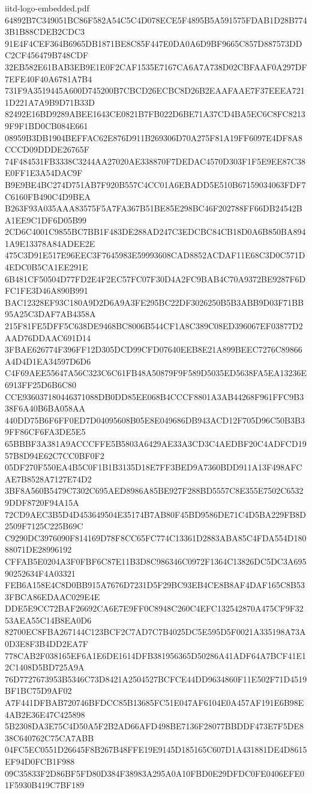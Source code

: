 \begin{filecontents*}[overwrite]{iitd-logo-embedded.pdf}
64892B7C349051BC86F582A54C5C4D078ECE5F4895B5A591575FDAB1D28B7743B1B88CDEB2CDC3
91E4F4CEF364B6965DB1871BE8C85F447E0DA0A6D9BF9665C857D887573DDC2CF456479B748CDF
32EB582E61BAB3EB9E1E0F2CAF1535E7167CA6A7A738D02CBFAAF0A297DF7EFE40F40A6781A7B4
731F9A3519445A600D745200B7CBCD26ECBC8D26B2EAAFAAE7F37EEEA7211D221A7A9B9D71B33D
82492E16BD9289ABEE1643CE0821B7FB022D6BE71A37CD4BA5EC6C8FC82139F9F1BD0CB084E661
08959B3DB1904BEFFAC62E876D911B269306D70A275F81A19FF6097E4DF8A8CCCD09DDDE26765F
74F484531FB3338C3244AA27020AE338870F7DEDAC4570D303F1F5E9EE87C38E0FF1E3A54DAC9F
B9E9BE4BC274D751AB7F920B557C4CC01A6EBADD5E510B67159034063FDF7C6160FB490C4D9BEA
B263F93A035AAA83575F5A7FA367B51BE85E298BC46F202788FF66DB24542BA1EE9C1DF6D05B99
2CD6C4001C9855BC7BB1F483DE288AD247C3EDCBC84CB18D0A6B850BA8941A9E13378A84ADEE2E
475C3D91E517E96EEC3F7645983E59993608CAD8852ACDAF11E68C3D0C571D4EDC0B5CA1EE291E
6B481CF50504D77FD2E4F2EC57FC07F30D4A2FC9BAB4C70A9372BE9287F6DFC1FE3D46A890B991
BAC12328EF93C180A9D2D6A9A3FE295BC22DF3026250B5B3ABB9D03F71BB95A25C3DAF7AB4358A
215F81FE5DFF5C638DE9468BC8006B544CF1A8C389C08ED396067EF03877D2AAD76DDAAC691D14
3FBAE626774F396FF12D305DCD99CFD07640EEB8E21A899BEEC7276C89866A4D4D1EA34597D6D6
C4F69AEE55647A56C323C6C61FB48A50879F9F589D5035ED5638FA5EA13236E6913FF25D6B6C80
CCE936037180446371088DB0DD85EE068B4CCCF8801A3AB44268F961FFC9B338F6A40B6BA058AA
440DD75B6F6FF0ED7D04095608B05E8E049686DB943ACD12F705D96C50B3B39FF86CF6FA3DE5E5
65BBBF3A381A9ACCCFFE5B5803A6429AE33A3CD3C4AEDBF20C4ADFCD1957B8D94E62C7CC0BF0F2
05DF270F550EA4B5C0F1B1B3135D18E7FF3BED9A7360BDD911A13F498AFCAE7B8528A7127E74D2
3BF8A560B5479C7302C695AED8986A85BE927F288BD5557C8E355E7502C65329DDF8720F94A15A
72CD9AEC3B5D4D453649504E35174B7AB80F45BD9586DE71C4D5BA229FB8D2509F7125C225B69C
C9290DC3976090F814169D78F8CC65FC774C13361D2883ABA85C4FDA554D18088071DE28996192
CFFAB5E0204A3F0FBF6C87E11B3D8C986346C0972F1364C13826DC5DC3A69590252634F4A03321
FEB6A158E4C8D0BB915A7676D7231D5F29BC93EB4CE8B8AF4DAF165C8B533FBCA86EDAAC029E4E
DDE5E9CC72BAF26692CA6E7E9FF0C8948C260C4EFC132542870A475CF9F3253AEA55C14B8EA0D6
82700EC8FBA267144C123BCF2C7AD7C7B4025DC5E595D5F0021A335198A73A0D3E8F3B4DD2EA7F
778CAB2F038165EF6A1E6DE1614DFB381956365D50286A41ADF64A7BCF41E12C1408D5BD725A9A
76D7727673953B5346C73D8421A2504527BCFCE44DD9634860F11E502F71D4519BF1BC75D9AF02
A7F441DFBAB720746BFDCC85B13685FC51E047AF6104E0A457AF191E6B98E4AB2E36E47C425898
5B2308DA3E75C4D50A5F2B2AD66AFD498BE7136F28077BBDDF473E7F5DE838C640762C75CA7ABB
04FC5EC0551D26645F8B267B48FFE19E9145D185165C607D1A431881DE4D8615EF94D0FCB1F988
09C35833F2D86BF5FD80D384F38983A295A0A10FBD0E29DFDC0FE0406EFE01F5930B419C7BF189

\end{filecontents*}
